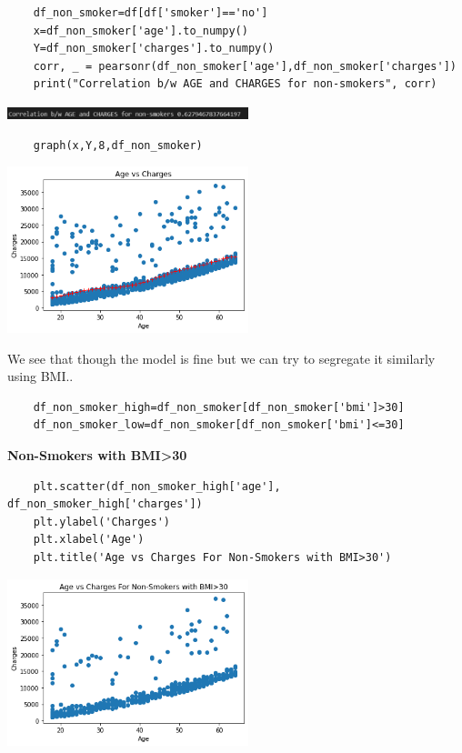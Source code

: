 \documentclass[12pt]{article}
\numberwithin{equation}{section}
\begin{document}
{\begin{lstlisting}
	df_non_smoker=df[df['smoker']=='no']
	x=df_non_smoker['age'].to_numpy()
	Y=df_non_smoker['charges'].to_numpy()
	corr, _ = pearsonr(df_non_smoker['age'],df_non_smoker['charges'])
	print("Correlation b/w AGE and CHARGES for non-smokers", corr)
\end{lstlisting}
\begin{center}
\includegraphics[width=7cm]{work15}
\end{center}
\begin{lstlisting}
	graph(x,Y,8,df_non_smoker)
\end{lstlisting}
\begin{center}
\includegraphics[width=7cm]{work16}
\end{center}
We see that though the model is fine but we can try to segregate it similarly using BMI..
\begin{lstlisting}
	df_non_smoker_high=df_non_smoker[df_non_smoker['bmi']>30]
	df_non_smoker_low=df_non_smoker[df_non_smoker['bmi']<=30]
\end{lstlisting}
\textbf{\large{Non-Smokers with BMI>30}}
\begin{lstlisting}
	plt.scatter(df_non_smoker_high['age'], df_non_smoker_high['charges'])
	plt.ylabel('Charges')
	plt.xlabel('Age')
	plt.title('Age vs Charges For Non-Smokers with BMI>30')
\end{lstlisting}
\begin{center}
\includegraphics[width=7cm]{work17}
\end{center}
}
\end{document}
